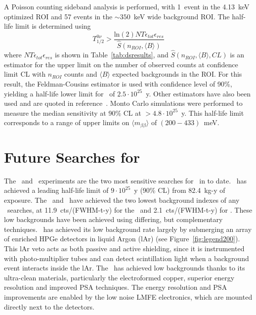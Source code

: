 \documentclass[/main.tex]{subfiles}
\begin{document}
A Poisson counting sideband analysis is performed, with 1~event in the 4.13~keV optimized ROI and 57 events in the ${\sim}350$~keV wide background ROI.
The half-life limit is determined using
\begin{equation}
  T_{1/2}^{0\nu}>\frac{\mathrm{ln}(2)NT\epsilon_{tot}\epsilon_{res}}{\hat{S}(n_{ROI}, \langle B\rangle)}
\end{equation}
where $NT\epsilon_{tot}\epsilon_{res}$ is shown in Table~\ref{tab:dsresults}, and $\hat{S}(n_{ROI}, \langle B\rangle, CL)$ is an estimator for the upper limit on the number of observed counts at confidence limit CL with $n_{ROI}$ counts and $\langle B\rangle$ expected backgrounds in the ROI.
For this result, the Feldman-Cousins estimator\cite{feldmancousins} is used with confidence level of 90\%, yielding a half-life lower limit for  \znbb\ of $2.5\cdot10^{25}$~y.
Other estimators have also been used and are quoted in reference~\cite{mjd2019}.
Monto Carlo simulations were performed to measure the median sensitivity at 90\% CL at $>4.8\cdot10^{25}$~y.
This half-life limit corresponds to a range of upper limits on $\langle m_{\beta\beta}\rangle$ of $(200-433)$~meV.

\section{Future Searches for  \znbb} \label{sec:legend}
The \MJD\ and \Gerda\ experiments are the two most sensitive searches for \znbb\ in  to date.
\Gerda\ has achieved a leading half-life limit of $9\cdot10^{25}$~y (90\% CL) from 82.4~kg-y of exposure\cite{gerda}.
The \MJD\ and \Gerda\ have achieved the two lowest background indexes of any \znbb\ searches, at 11.9~cts/(FWHM-t-y) for the \MJD\ and 2.1~cts/(FWHM-t-y) for \Gerda.
These low backgrounds have been achieved using differing, but complementary techniques.
\Gerda\ has achieved its low background rate largely by submerging an array of enriched HPGe detectors in liquid Argon (lAr) (see Figure~\ref{fig:legend200}).
This lAr veto acts as both passive and active shielding, since it is instrumented with photo-multiplier tubes and can detect scintillation light when a background event interacts inside the lAr.
The \MJD\ has achieved low backgrounds thanks to its ultra-clean materials, particularly the electroformed copper, superior energy resolution and improved PSA techniques.
The energy resolution and PSA improvements are enabled by the low noise LMFE electronics, which are mounted directly next to the detectors.
\end{document}
